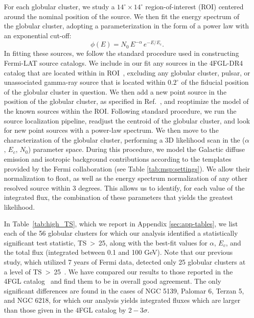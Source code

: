 For each globular cluster, we study a $14^{\circ} \times 14^{\circ}$ region-of-interest (ROI) centered around the nominal position of the source. We then fit the energy spectrum of the globular cluster, adopting a parameterization in the form of a power law with an exponential cut-off:
\begin{equation}
    \phi(E) = N_0 \, E^{-\alpha} \, e^{-E/E_c}. 
\label{eq:energy-spectrum}
\end{equation}
%
In fitting these sources, we follow the standard procedure used in constructing Fermi-LAT source catalogs. 
We include in our fit any sources in the 4FGL-DR4 catalog that are located within in ROI~\cite{Ballet:2023qzs}, excluding any globular cluster, pulsar, or unassociated gamma-ray source that is located within $0.2^\circ$ of the fiducial position of the globular cluster in question. We then add a new point source in the position of the globular cluster, as specified in Ref.~\cite{harris2010newcatalogglobularclusters}, and reoptimize the model of the known sources within the ROI.
Following standard procedure, we run the source localization pipeline, readjust the centroid of the globular cluster, and look for new point sources with a power-law spectrum. 
We then move to the characterization of the globular cluster, performing a 3D likelihood scan in the ($\alpha$, $E_{c}$, $N_0$) parameter space. 
%
During this procedure, we model the Galactic diffuse emission and isotropic background contributions according to the templates provided by the Fermi collaboration (see Table \ref{tab:msp:settings}). We allow their normalization to float, as well as the energy spectrum normalization of any other resolved source within 3 degrees.
%
This allows us to identify, for each value of the integrated flux, the combination of these parameters that yields the greatest likelihood. 

In Table~\ref{tab:high_TS}, which we report in Appendix \ref{sec:app-tables}, we list each of the 56 globular clusters for which our analysis identified a statistically significant test statistic, \mbox{TS > 25}, along with the best-fit values for $\alpha$, $E_c$, and the total flux (integrated between 0.1 and 100 GeV). Note that our previous study, which utilized 7 years of Fermi data, detected only 25 globular clusters at a level of \mbox{TS > 25}~\cite{Hooper:2016rap}. We have compared our results to those reported in the 4FGL catalog~\cite{Ballet:2023qzs} and find them to be in overall good agreement. The only significant differences are found in the cases of NGC 5139, Palomar 6, Terzan 5, and NGC 6218, for which our analysis yields integrated fluxes which are larger than those given in the 4FGL catalog by $2-3\sigma$. 


